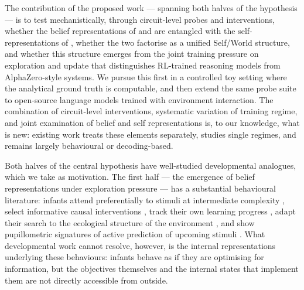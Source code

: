 \documentclass[11pt]{article}
\begin{document}
The contribution of the proposed work --- spanning both halves of the hypothesis --- is to test mechanistically, through circuit-level probes and interventions, whether the belief representations of \citet{shai2024belief} and \citet{hennig2023emergence} are entangled with the self-representations of \citet{betley2025tellme}, whether the two factorise as a unified Self/World structure, and whether this structure emerges from the joint training pressure on exploration and update that distinguishes RL-trained reasoning models from AlphaZero-style systems. We pursue this first in a controlled toy setting where the analytical ground truth is computable, and then extend the same probe suite to open-source language models trained with environment interaction. The combination of circuit-level interventions, systematic variation of training regime, and joint examination of belief and self representations is, to our knowledge, what is new: existing work treats these elements separately, studies single regimes, and remains largely behavioural or decoding-based.

Both halves of the central hypothesis have well-studied developmental analogues, which we take as motivation. The first half --- the emergence of belief representations under exploration pressure --- has a substantial behavioural literature: infants attend preferentially to stimuli at intermediate complexity \citep[the Goldilocks effect,][]{kidd2012goldilocks}, select informative causal interventions \citep{lapidow2020informative}, track their own learning progress \citep{poli2020infants}, adapt their search to the ecological structure of the environment \citep{ruggeri2022ecological}, and show pupillometric signatures of active prediction of upcoming stimuli \citep{zhang2019prediction}. What developmental work cannot resolve, however, is the internal representations underlying these behaviours: infants behave as if they are optimising for information, but the objectives themselves and the internal states that implement them are not directly accessible from outside.
\end{document}
